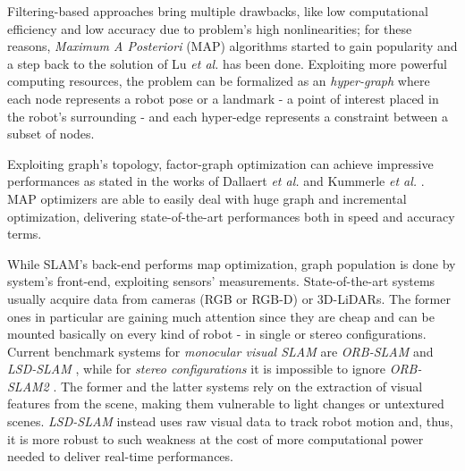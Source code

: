 \documentclass[10pt,a4paper, notitlepage]{report}
\begin{document}
Filtering-based approaches bring multiple drawbacks, like low computational efficiency and low accuracy due to problem's high nonlinearities; for these reasons, \textit{Maximum A Posteriori} (MAP) algorithms started to gain popularity and a step back to the solution of Lu \textit{et al.} \cite{lu1997globally} has been done. Exploiting more powerful computing resources, the problem can be formalized as an \textit{hyper-graph} where each node represents a robot pose or a landmark - a point of interest placed in the robot's surrounding - and each hyper-edge represents a constraint between a subset of nodes. 

Exploiting graph's topology, factor-graph optimization can achieve impressive performances as stated in the works of Dallaert \textit{et al.} \cite{dellaert2006square} and Kummerle \textit{et al.}  \cite{kummerle2011g}. MAP optimizers \cite{kummerle2011g} \cite{dellaert2012gtsam} \cite{ceres-solver} \cite{kaess2012isam2} are able to easily deal with huge graph and incremental optimization, delivering state-of-the-art performances both in speed and accuracy terms.

While SLAM's back-end performs map optimization, graph population is done by system's front-end, exploiting sensors' measurements. State-of-the-art systems usually acquire data from cameras (RGB or RGB-D) or 3D-LiDARs. The former ones in particular are gaining much attention since they are cheap and can be mounted basically on every kind of robot - in single or stereo configurations. Current benchmark systems for \textit{monocular visual SLAM} are \textit{ORB-SLAM} \cite{mur2015orb-slam} and \textit{LSD-SLAM} \cite{engel2014lsd-slam}, while for \textit{stereo configurations} it is impossible to ignore \textit{ORB-SLAM2} \cite{mur2017orb-slam2}. The former and the latter systems rely on the extraction of visual features from the scene, making them vulnerable to light changes or untextured scenes. \textit{LSD-SLAM} instead uses raw visual data to track robot motion and, thus, it is more robust to such weakness at the cost of more computational power needed to deliver real-time performances.
\end{document}
